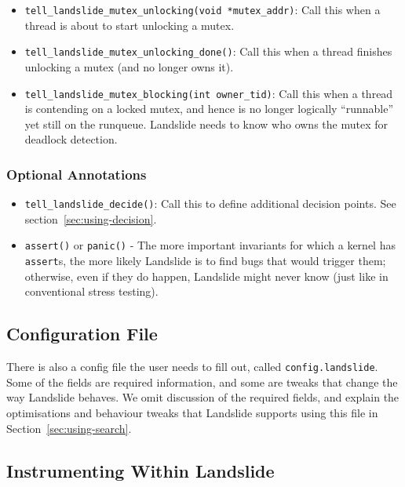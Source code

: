 \begin{itemize}
\begin{itemize}
		\item \texttt{tell\_landslide\_mutex\_unlocking(void *mutex\_addr)}: Call this when a thread is about to start unlocking a mutex.
		\item \texttt{tell\_landslide\_mutex\_unlocking\_done()}: Call this when a thread finishes unlocking a mutex (and no longer owns it).
		\item \texttt{tell\_landslide\_mutex\_blocking(int owner\_tid)}: Call this when a thread is contending on a locked mutex, and hence is no longer logically ``runnable'' yet still on the runqueue. Landslide needs to know who owns the mutex for deadlock detection.
	\end{itemize}
\end{itemize}

\subsubsection{Optional Annotations}
\begin{itemize}
	\small
	\item \texttt{tell\_landslide\_decide()}: Call this to define additional decision points. See section~\ref{sec:using-decision}.
	\item \texttt{assert()} or \texttt{panic()} -
		The more important invariants for which a kernel has \texttt{assert}s, the more likely Landslide is to find bugs that would trigger them; otherwise, even if they do happen, Landslide might never know (just like in conventional stress testing).
\end{itemize}

\subsection{Configuration File}
\label{sec:using-config-landslide}

There is also a config file the user needs to fill out, called \texttt{config.landslide}. Some of the fields are required information, and some are tweaks that change the way Landslide behaves. We omit discussion of the required fields, and explain the optimisations and behaviour tweaks that Landslide supports using this file in Section~\ref{sec:using-search}.

\subsection{Instrumenting Within Landslide}
\label{sec:using-student-c}

